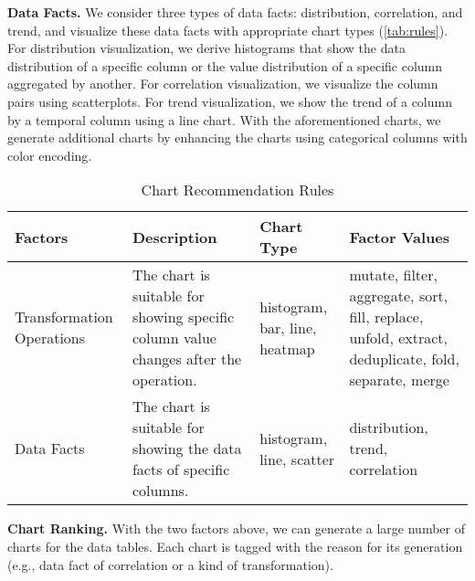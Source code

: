 \textbf{Data Facts.} 
We consider three types of data facts: distribution, correlation, and trend, and visualize these data facts with appropriate chart types (\autoref{tab:rules}). 
For distribution visualization, we derive histograms that show the data distribution of a specific column or the value distribution of a specific column aggregated by another.
For correlation visualization, we visualize the column pairs using scatterplots.
For trend visualization, we show the trend of a column by a temporal column using a line chart.
With the aforementioned charts, we generate additional charts by enhancing the charts using categorical columns with color encoding.


\begin{table*}
  \caption{Chart Recommendation Rules}
  \small
  \label{tab:rules}
  \begin{tabular}{p{1.5cm}p{4.8cm}p{1.8cm}p{5.5cm}}
    \toprule
    Factors&Description&Chart Type& Factor Values\\
    \midrule
    Transformation Operations & The chart is suitable for showing specific column value changes after the operation. & histogram, bar, line, heatmap& mutate, filter, aggregate, sort, fill, replace, unfold, extract, deduplicate, fold, separate, merge\\
    \midrule
    Data Facts & The chart is suitable for showing the data facts of specific columns. & histogram, line, scatter&distribution, trend, correlation\\
  \bottomrule
\end{tabular}
\end{table*}

\textbf{Chart Ranking.} 
\label{sec:ranking}
With the two factors above, we can generate a large number of charts for the data tables. 
Each chart is tagged with the reason for its generation (e.g., data fact of correlation or a kind of transformation).

